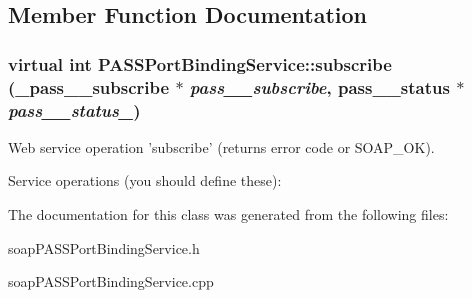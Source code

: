 \subsection{Member Function Documentation}
\hypertarget{classPASSPortBindingService_a2078c6b6e2359c4992be179e0713c086}{
\subsubsection[{subscribe}]{\setlength{\rightskip}{0pt plus 5cm}virtual int PASSPortBindingService::subscribe ({\bf \_\-pass\_\-\_\-subscribe} $\ast$ {\em pass\_\-\_\-subscribe}, \/  {\bf pass\_\-\_\-status} $\ast$ {\em pass\_\-\_\-status\_\-})}}
\label{classPASSPortBindingService_a2078c6b6e2359c4992be179e0713c086}


Web service operation 'subscribe' (returns error code or SOAP\_\-OK). 

Service operations (you should define these): 

The documentation for this class was generated from the following files:\begin{DoxyCompactItemize}
\item 
soapPASSPortBindingService.h\item 
soapPASSPortBindingService.cpp\end{DoxyCompactItemize}
